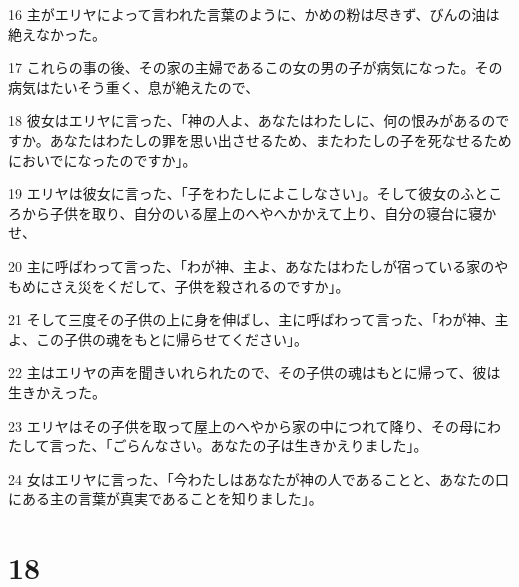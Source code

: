 \par 16 主がエリヤによって言われた言葉のように、かめの粉は尽きず、びんの油は絶えなかった。
\par 17 これらの事の後、その家の主婦であるこの女の男の子が病気になった。その病気はたいそう重く、息が絶えたので、
\par 18 彼女はエリヤに言った、「神の人よ、あなたはわたしに、何の恨みがあるのですか。あなたはわたしの罪を思い出させるため、またわたしの子を死なせるためにおいでになったのですか」。
\par 19 エリヤは彼女に言った、「子をわたしによこしなさい」。そして彼女のふところから子供を取り、自分のいる屋上のへやへかかえて上り、自分の寝台に寝かせ、
\par 20 主に呼ばわって言った、「わが神、主よ、あなたはわたしが宿っている家のやもめにさえ災をくだして、子供を殺されるのですか」。
\par 21 そして三度その子供の上に身を伸ばし、主に呼ばわって言った、「わが神、主よ、この子供の魂をもとに帰らせてください」。
\par 22 主はエリヤの声を聞きいれられたので、その子供の魂はもとに帰って、彼は生きかえった。
\par 23 エリヤはその子供を取って屋上のへやから家の中につれて降り、その母にわたして言った、「ごらんなさい。あなたの子は生きかえりました」。
\par 24 女はエリヤに言った、「今わたしはあなたが神の人であることと、あなたの口にある主の言葉が真実であることを知りました」。

\chapter{18}

